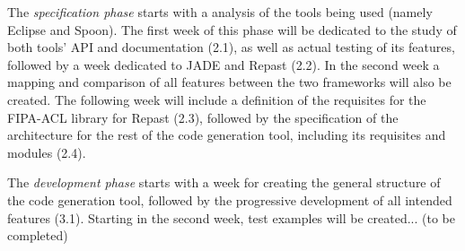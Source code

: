 The \emph{specification phase} starts with a analysis of the tools being used (namely Eclipse and Spoon). The first week of this phase will be dedicated to the study of both tools' API and documentation (2.1), as well as actual testing of its features, followed by a week dedicated to JADE and Repast (2.2). In the second week a mapping and comparison of all features between the two frameworks will also be created. The following week will include a definition of the requisites for the FIPA-ACL library for Repast (2.3), followed by the specification of the architecture for the rest of the code generation tool, including its requisites and modules (2.4).

The \emph{development phase} starts with a week for creating the general structure of the code generation tool, followed by the progressive development of all intended features (3.1). Starting in the second week, test examples will be created... (to be completed)
